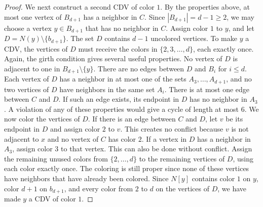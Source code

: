 \documentclass{article}
\theoremstyle{definition}
\begin{document}
\begin{proof}
We next construct a second CDV of color $1$. By the properties above, at most one vertex of $B_{d+1}$ has a neighbor in $C$. Since $|B_{d+1}|=d-1\geq 2$, we may choose a vertex $y\in B_{d+1}$ that has no neighbor in $C$. Assign color $1$ to $y$, and let $D=N(y)\setminus\{b_{d+1}\}$. The set $D$ contains $d-1$ uncolored vertices. To make $y$ a CDV, the vertices of $D$ must receive the colors in $\{2,3,\ldots,d\}$, each exactly once. Again, the girth condition gives several useful properties. 
No vertex of $D$ is adjacent to one in $B_{d+1}\setminus\{y\}$.
There are no edges between $D$ and $B_i$ for $i \le d$. Each vertex of $D$ has a neighbor in at most one of the sets $A_3,\ldots,A_{d+1}$, and no two vertices of $D$ have neighbors in the same set $A_i$. 
There is at most one edge between $C$ and $D$.
If such an edge exists, its endpoint in $D$ has no neighbor in $A_3$.
A violation of any of these properties would give a cycle of length at most $6$. 
We now color the vertices of $D$.
If there is an edge between $C$ and $D$, let $v$ be its endpoint in $D$ and assign color $2$ to $v$. This creates no conflict because $v$ is not adjacent to $x$ and no vertex of $C$ has color $2$.
If a vertex in $D$ has a neighbor in $A_3$, assign color 3 to that vertex.  This can also be done without conflict.
Assign the remaining unused colors from $\{2,\ldots,d\}$ to the remaining vertices of $D$, using each color exactly once.
The coloring is still proper since none of these vertices have neighbors that have already been colored.
Since $N[y]$ contains color $1$ on $y$, color $d+1$ on $b_{d+1}$, and every color from $2$ to $d$ on the vertices of $D$, we have made $y$ a CDV of color $1$.


\end{proof}
\end{document}
